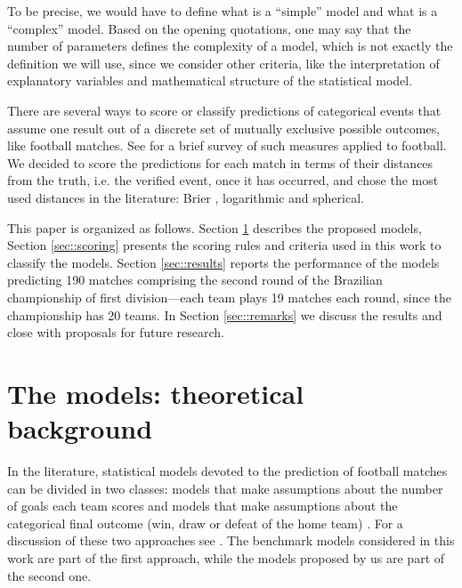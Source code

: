 \documentclass[journal,article,accept,moreauthors,pdftex,12pt,a4paper]{mdpi}
\begin{document}
    To be precise, we would have to define what is a ``simple'' model and what is a ``complex'' model. Based on the opening quotations, one may say that the number of parameters defines the complexity of a model, which is not exactly the definition we will use, since we consider other criteria, like the interpretation of explanatory variables and mathematical structure of the statistical model.


    There are several ways to score or classify predictions of categorical events that assume one result out of a discrete set of mutually exclusive possible outcomes, like football matches.
    See \cite{constantinou} for a brief survey of such measures applied to football.
    We decided to score the predictions for each match in terms of their distances from the truth, i.e. the verified event, once it has occurred, and chose the most used distances in the literature: Brier \cite{brier1950}, logarithmic and spherical.

    This paper is organized as follows.
    Section \ref{sec::experimental} describes the proposed models, Section \ref{sec::scoring} presents the scoring rules and criteria used in this work to classify the models.
    Section \ref{sec::results} reports the performance of the models predicting 190 matches comprising the second round of the Brazilian championship of first division---each team plays 19 matches each round, since the championship has 20 teams.
    In Section \ref{sec::remarks} we discuss the results and close with proposals for future research.



    \section{The models: theoretical background}
    \label{sec::experimental}

    In the literature, statistical models devoted to the prediction of
    football matches can be divided in two classes: models that make
    assumptions about the number of goals each team scores
    \citep{Maher82, Dixon97, Lee97, Karlis2003} and models that make
    assumptions about the categorical final outcome (win, draw or defeat
    of the home team) \citep{Forrest2000, Koning2000, Brillinger2008,
        Brillinger2009}. For a discussion of these two approaches see
    \cite{Goddard2005}. The benchmark models considered in this work are
    part of the first approach, while the models proposed by us are part
    of the second one.
\end{document}
